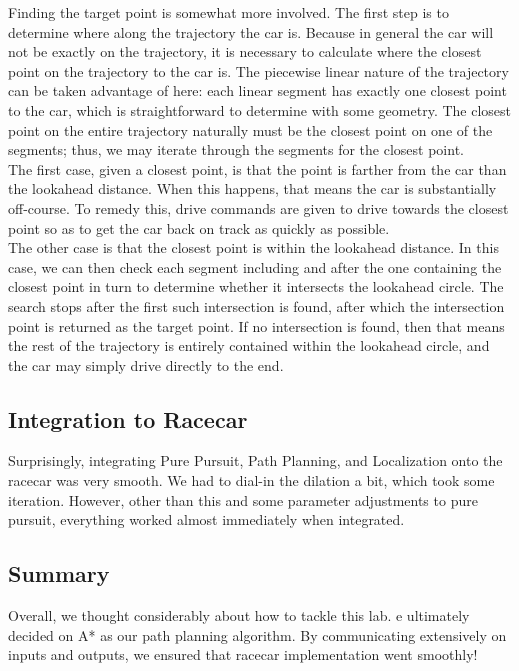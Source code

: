 \documentclass{article}
\begin{document}
Finding the target point is somewhat more involved. The first step is to determine where along the trajectory the car is. Because in general the car will not be exactly on the trajectory, it is necessary to calculate where the closest point on the trajectory to the car is. The piecewise linear nature of the trajectory can be taken advantage of here: each linear segment has exactly one closest point to the car, which is straightforward to determine with some geometry. The closest point on the entire trajectory naturally must be the closest point on one of the segments; thus, we may iterate through the segments for the closest point. \\

The first case, given a closest point, is that the point is farther from the car than the lookahead distance. When this happens, that means the car is substantially off-course. To remedy this, drive commands are given to drive towards the closest point so as to get the car back on track as quickly as possible. \\

The other case is that the closest point is within the lookahead distance. In this case, we can then check each segment including and after the one containing the closest point in turn to determine whether it intersects the lookahead circle. The search stops after the first such intersection is found, after which the intersection point is returned as the target point. If no intersection is found, then that means the rest of the trajectory is entirely contained within the lookahead circle, and the car may simply drive directly to the end.

\subsection{Integration to Racecar} 

Surprisingly, integrating Pure Pursuit, Path Planning, and Localization onto the racecar was very smooth. We had to dial-in the dilation a bit, which took some iteration. However, other than this and some parameter adjustments to pure pursuit, everything worked almost immediately when integrated. 

\subsection{Summary}
Overall, we thought considerably about how to tackle this lab. e ultimately decided on A* as our path planning algorithm. By communicating extensively on inputs and outputs, we ensured that racecar implementation went smoothly!
\end{document}
